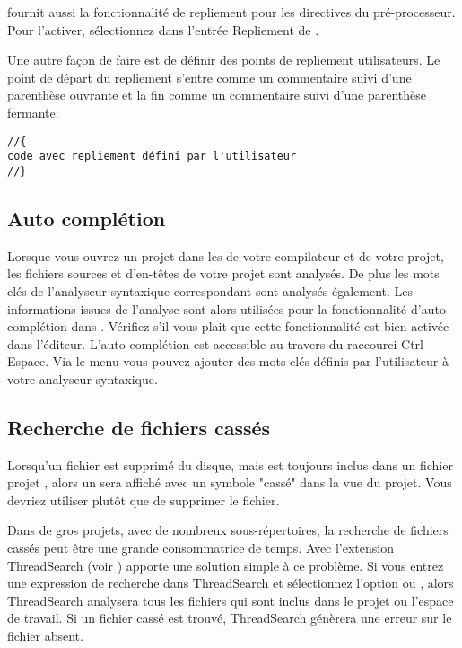 
\codeblocks fournit aussi la fonctionnalité de repliement pour les directives du pré-processeur. Pour l'activer, sélectionnez  dans l'entrée Repliement de .

Une autre façon de faire est de définir des points de repliement utilisateurs. Le point de départ du repliement s'entre comme un commentaire suivi d'une parenthèse ouvrante et la fin comme un commentaire suivi d'une parenthèse fermante.

\begin{verbatim}
//{
code avec repliement défini par l'utilisateur
//}
\end{verbatim}

\subsection{Auto complétion}

Lorsque vous ouvrez un projet dans \codeblocks les  de votre compilateur et de votre projet, les fichiers sources et d'en-têtes de votre projet sont analysés. De plus les mots clés de l'analyseur syntaxique correspondant sont analysés également. Les informations issues de l'analyse sont alors utilisées pour la fonctionnalité d'auto complétion dans \codeblocks. Vérifiez s'il vous plait que cette fonctionnalité est bien activée dans l'éditeur. L'auto complétion est accessible au travers du raccourci Ctrl-Espace. Via le menu  vous pouvez ajouter des mots clés définis par l'utilisateur à votre analyseur syntaxique.

\subsection{Recherche de fichiers cassés}

Lorsqu'un fichier est supprimé du disque, mais est toujours inclus dans un fichier projet , alors un  sera affiché avec un symbole "cassé" dans la vue du projet. Vous devriez utiliser   plutôt que de supprimer le fichier.

Dans de gros projets, avec de nombreux sous-répertoires, la recherche de fichiers cassés peut être une grande consommatrice de temps. Avec l'extension ThreadSearch (voir ) \codeblocks apporte une solution simple à ce problème. Si vous entrez une expression de recherche dans ThreadSearch et sélectionnez l'option  ou , alors ThreadSearch analysera tous les fichiers qui sont inclus dans le projet ou l'espace de travail. Si un fichier cassé est trouvé, ThreadSearch génèrera une erreur sur le fichier absent.

